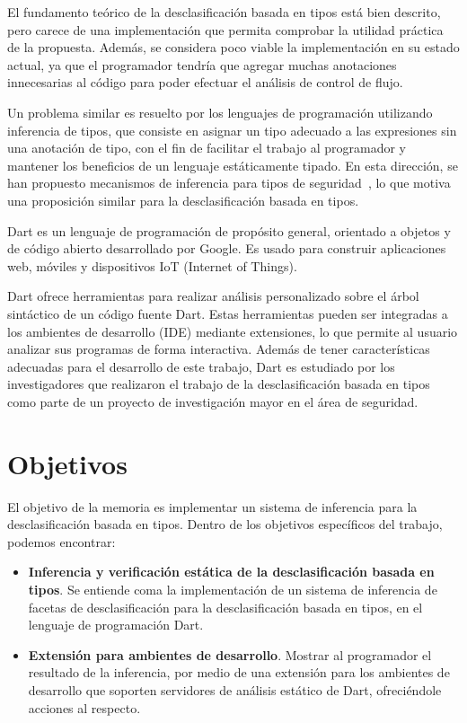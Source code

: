 \begin{intro}
	El fundamento teórico de la desclasificación basada en tipos está bien descrito, pero carece de una implementación que permita comprobar la utilidad práctica de la propuesta. Además, se considera poco viable la implementación en su estado actual, ya que el programador tendría que agregar muchas anotaciones innecesarias al código para poder efectuar el análisis de control de flujo.

	Un problema similar es resuelto por los lenguajes de programación utilizando inferencia de tipos, que consiste en asignar un tipo adecuado a las expresiones sin una anotación de tipo, con el fin de facilitar el trabajo al programador y mantener los beneficios de un lenguaje estáticamente tipado. En esta dirección, se han propuesto mecanismos de inferencia para tipos de seguridad~\cite{Pottier}, lo que motiva una proposición similar para la desclasificación basada en tipos.

	Dart es un lenguaje de programación de propósito general, orientado a objetos y de código abierto desarrollado por Google. Es usado para construir aplicaciones web, móviles y dispositivos IoT (Internet of Things).

	Dart ofrece herramientas para realizar análisis personalizado sobre el árbol sintáctico de un código fuente Dart. Estas herramientas pueden ser integradas a los ambientes de desarrollo (IDE) mediante extensiones, lo que permite al usuario analizar sus programas de forma interactiva. Además de tener características adecuadas para el desarrollo de este trabajo, Dart es estudiado por los investigadores que realizaron el trabajo de la desclasificación basada en tipos como parte de un proyecto de investigación mayor en el área de seguridad.

	\section{Objetivos}
	El objetivo de la memoria es implementar un sistema de inferencia para la desclasificación basada en tipos. Dentro de los objetivos específicos del trabajo, podemos encontrar:

	\begin{itemize}
	\item \textbf{Inferencia y verificación estática de la desclasificación basada en tipos}. Se entiende coma la implementación de un sistema de inferencia de facetas de desclasificación para la desclasificación basada en tipos, en el lenguaje de programación Dart.

	\item \textbf{Extensión para ambientes de desarrollo}. Mostrar al programador el resultado de la inferencia, por medio de una extensión para los ambientes de desarrollo que soporten servidores de análisis estático de Dart, ofreciéndole acciones al respecto.


\end{itemize}
\end{intro}
